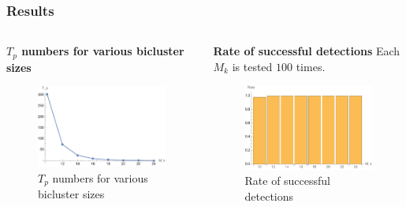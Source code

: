 \documentclass{beamer}
\begin{document}
\begin{frame}
    \frametitle{Results}
    \begin{columns}[T]
        \begin{column}{0.5\textwidth}
            \centering
            \textbf{$T_p$ numbers for various bicluster sizes}
            \begin{figure}[htb]
                \centering
                \includegraphics[width=0.8\linewidth]{Tp.pdf}
                \caption{$T_p$ numbers for various bicluster sizes}
                \label{fig:image3}
            \end{figure}
        \end{column}
        \begin{column}{0.5\textwidth}
            \textbf{Rate of successful detections}
            Each $M_k$ is tested $100$ times.
            \begin{figure}[htb]
                \centering
                \includegraphics[width=0.8\linewidth]{numofsuc.pdf}
                \caption{Rate of successful detections}
                \label{fig:image4}
            \end{figure}
        \end{column}
    \end{columns}
\end{frame}
\end{document}
